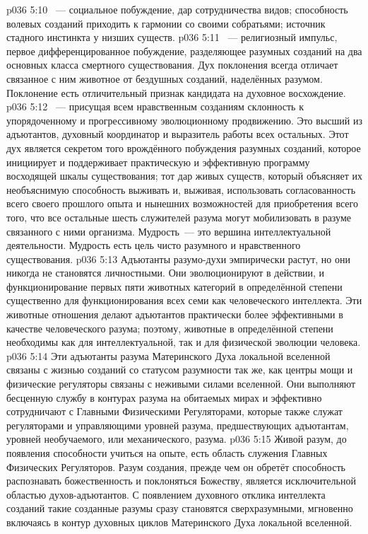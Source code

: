 \vs p036 5:10 ~--- социальное побуждение, дар сотрудничества видов; способность волевых созданий приходить к гармонии со своими собратьями; источник стадного инстинкта у низших существ.
\vs p036 5:11 ~--- религиозный импульс, первое дифференцированное побуждение, разделяющее разумных созданий на два основных класса смертного существования. Дух поклонения всегда отличает связанное с ним животное от бездушных созданий, наделённых разумом. Поклонение есть отличительный признак кандидата на духовное восхождение.
\vs p036 5:12 ~--- присущая всем нравственным созданиям склонность к упорядоченному и прогрессивному эволюционному продвижению. Это высший из адъютантов, духовный координатор и выразитель работы всех остальных. Этот дух является секретом того врождённого побуждения разумных созданий, которое инициирует и поддерживает практическую и эффективную программу восходящей шкалы существования; тот дар живых существ, который объясняет их необъяснимую способность выживать и, выживая, использовать согласованность всего своего прошлого опыта и нынешних возможностей для приобретения всего того, что все остальные шесть служителей разума могут мобилизовать в разуме связанного с ними организма. Мудрость~--- это вершина интеллектуальной деятельности. Мудрость есть цель чисто разумного и нравственного существования.
\vs p036 5:13 \pc Адъютанты разумо\hyp{}духи эмпирически растут, но они никогда не становятся личностными. Они эволюционируют в действии, и функционирование первых пяти животных категорий в определённой степени существенно для функционирования всех семи как человеческого интеллекта. Эти животные отношения делают адъютантов практически более эффективными в качестве человеческого разума; поэтому, животные в определённой степени необходимы как для интеллектуальной, так и для физической эволюции человека.
\vs p036 5:14 Эти адъютанты разума Материнского Духа локальной вселенной связаны с жизнью созданий со статусом разумности так же, как центры мощи и физические регуляторы связаны с неживыми силами вселенной. Они выполняют бесценную службу в контурах разума на обитаемых мирах и эффективно сотрудничают с Главными Физическими Регуляторами, которые также служат регуляторами и управляющими уровней разума, предшествующих адъютантам, уровней необучаемого, или механического, разума.
\vs p036 5:15 Живой разум, до появления способности учиться на опыте, есть область служения Главных Физических Регуляторов. Разум создания, прежде чем он обретёт способность распознавать божественность и поклоняться Божеству, является исключительной областью  духов\hyp{}адъютантов. С появлением духовного отклика интеллекта созданий такие созданные разумы сразу становятся сверхразумными, мгновенно включаясь в контур духовных циклов Материнского Духа локальной вселенной.
